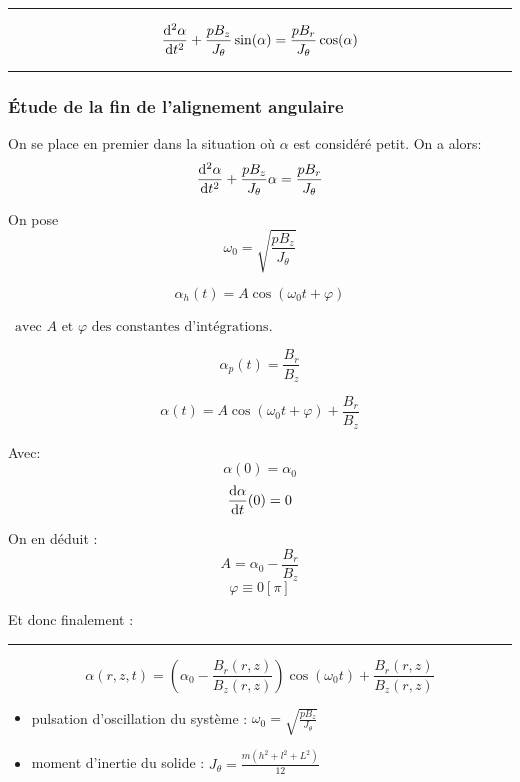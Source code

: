 \documentclass{report}
\begin{document}
\rule{\textwidth}{0.4pt}
\begin{center}
$$\frac{\mathrm{d^2}\alpha}{\mathrm{d}t^2} + \frac{pB_z}{J_\theta}\sin(\alpha) = \frac{pB_r}{J_\theta} \cos(\alpha)$$    
\end{center}

\rule{\textwidth}{0.4pt}

\subsubsection{Étude de la fin de l'alignement angulaire}
On se place en premier dans la situation où $\alpha$ est considéré petit. On a alors:
$$\frac{\mathrm{d^2}\alpha}{\mathrm{d}t^2} + \frac{pB_z}{J_\theta}\alpha = \frac{pB_r}{J_\theta} $$

On pose $$\omega_0 = \sqrt{\frac{pB_z}{J_\theta}}$$


$$\alpha_h(t) = A \cos(\omega_0 t + \varphi)$$

$\, \text{ avec } A \text{ et } \varphi \text{ des constantes d'intégrations}$.


$$\alpha_p(t) = \frac{B_r}{B_z}$$



$$\alpha(t) = A \cos(\omega_0 t + \varphi) + \frac{B_r}{B_z}$$


Avec:
$$\alpha(0) = \alpha_0$$
$$\frac{\mathrm{d}\alpha}{\mathrm{d}t} (0) = 0$$

On en déduit : 
$$A = \alpha_0  - \frac{B_r}{B_z}$$
$$\varphi \equiv 0 \left[\pi\right] $$ 

Et donc finalement :\newpage

\rule{\textwidth}{0.4pt}
\begin{center}
    $$\alpha(r,z,t) = \left(\alpha_0  - \frac{B_r(r,z)}{B_z(r,z)}\right) \cos(\omega_0 t) + \frac{B_r(r,z)}{B_z(r,z)}$$    

\begin{itemize}
    \item pulsation d'oscillation du système : $\omega_0 = \sqrt{\frac{pB_z}{J_\theta}}$
    \item moment d'inertie du solide : $J_\theta = \frac{m(h^2+l^2+L^2)}{12}$
\end{itemize}
\end{center}
\end{document}
